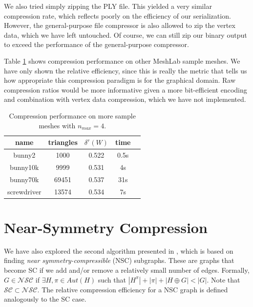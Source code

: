 \documentclass{egpubl}
\begin{document}
We also tried simply zipping the PLY file. This yielded a very similar compression rate, which reflects poorly on the efficiency of our serialization. However, the general-purpose file compressor is also allowed to zip the vertex data, which we have left untouched. Of course, we can still zip our binary output to exceed the performance of the general-purpose compressor.


Table \ref{tab:more_meshes} shows compression performance on other MeshLab sample meshes.
We have only shown the relative efficiency, since this is really the metric that tells us how appropriate this compression paradigm is for the graphical domain. Raw compression ratios would be more informative given a more bit-efficient encoding and combination with vertex data compression, which we have not implemented.

\begin{table}
        \centering
        \begin{tabular}{|c|c|c|c|c|}
        \hline
        name & triangles & $\delta^r(W)$ & time \\
        \hline
        bunny2 & 1000 & 0.522 & 0.5s \\
        bunny10k & 9999 & 0.531 & 4s \\
        bunny70k & 69451 & 0.537 & 31s \\
        screwdriver & 13574 & 0.534 & 7s \\
        \hline
\end{tabular}
\caption{Compression performance on more sample meshes with $n_{max} = 4$.}
\label{tab:more_meshes}
\end{table}



\section{Near-Symmetry Compression} \label{sec:near_symmetry}

We have also explored the second algorithm presented in \cite{cibej2021automorphisms}, which is based on finding \textit{near symmetry-compressible} (NSC) subgraphs.
These are graphs that become SC if we add and/or remove a relatively small number of edges.
Formally, $G \in \mathcal{N}\mathcal{S}\mathcal{C}$ if $\exists H, \pi \in Aut(H)$ such that $|H^\pi| + |\pi| + |H \oplus G| < |G|$. Note that $\mathcal{S}\mathcal{C} \subset \mathcal{N}\mathcal{S}\mathcal{C}$.
The relative compression efficiency for a NSC graph is defined analogously to the SC case.
\end{document}
